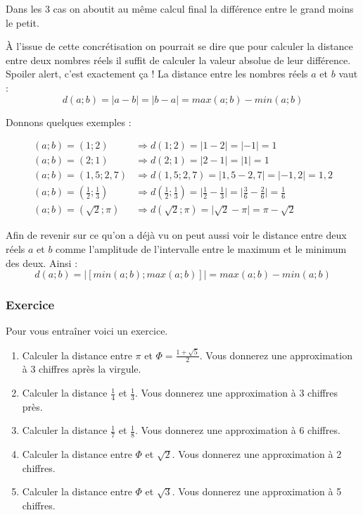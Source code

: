 \documentclass[a4paper, 11pt, twoside]{article}
\begin{document}
Dans les 3 cas on aboutit au même calcul final la différence entre
le grand moins le petit.


À l'issue de cette concrétisation on pourrait se dire que pour
calculer la distance entre deux nombres réels il suffit de calculer
la valeur absolue de leur différence. Spoiler alert, c'est
exactement ça ! La distance entre les nombres réels \(a\) et \(b\)
vaut :
\[d(a; b) = \lvert a - b \rvert = \lvert b - a \rvert = max(a ;
   b) - min(a ; b)\]


Donnons quelques exemples :

\begin{align*}
(a; b) = (1; 2) &\Rightarrow d(1; 2) = \lvert 1 - 2 \rvert = \lvert -1\rvert = 1\\
(a; b) = (2; 1) &\Rightarrow d(2; 1) = \lvert 2 - 1 \rvert = \lvert 1\rvert = 1\\
(a; b) = (1,5; 2,7) &\Rightarrow d(1,5; 2,7) = \lvert 1,5 - 2,7 \rvert = \lvert -1,2\rvert = 1,2\\
(a; b) = \left(\frac{1}{2}; \frac{1}{3}\right) &\Rightarrow d\left(\frac{1}{2}; \frac{1}{3}\right) = \lvert \frac{1}{2} - \frac{1}{3} \rvert = \lvert \frac{3}{6} - \frac{2}{6}\rvert = \frac{1}{6}\\
(a; b) = (\sqrt{2}; \pi) &\Rightarrow d(\sqrt{2}; \pi) = \lvert \sqrt{2} - \pi \rvert = \pi - \sqrt{2}
\end{align*}

Afin de revenir sur ce qu'on a déjà vu on peut aussi voir le
distance entre deux réels \(a\) et \(b\) comme l'amplitude de
l'intervalle entre le maximum et le minimum des deux. Ainsi :
\[d(a ; b) = |[min(a ; b) ; max(a ; b)]| = max(a ; b) - min(a ; b)\]

\subsubsection{Exercice}
\label{sec:org8920b07}
Pour vous entraîner voici un exercice.

\begin{enumerate}
\item Calculer la distance entre \(\pi\) et \(\Phi = \frac{1 +
       \sqrt{5}}{2}\). Vous donnerez une approximation à 3 chiffres
après la virgule.
\item Calculer la distance \(\frac{1}{4}\) et \(\frac{1}{3}\). Vous
donnerez une approximation à 3 chiffres près.
\item Calculer la distance \(\frac{1}{7}\) et \(\frac{1}{8}\). Vous
donnerez une approximation à 6 chiffres.
\item Calculer la distance entre \(\Phi\) et \(\sqrt{2}\). Vous donnerez
une approximation à 2 chiffres.
\item Calculer la distance entre \(\Phi\) et \(\sqrt{3}\). Vous donnerez
une approximation à 5 chiffres.
\end{enumerate}
\end{document}
